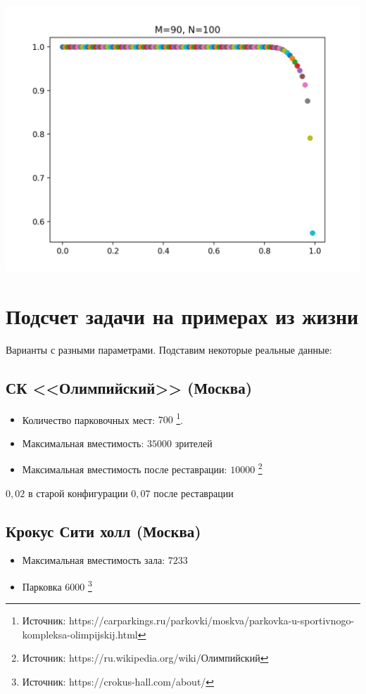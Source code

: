 \includegraphics[scale=0.5]{img/100_90}

\section{Подсчет задачи на примерах из жизни}

Варианты с разными параметрами. Подставим некоторые реальные данные:

\subsection{СК <<Олимпийский>> (Москва)}

\begin{itemize}
	\item Количество парковочных мест: $700$ \footnote{Источник: https://carparkings.ru/parkovki/moskva/parkovka-u-sportivnogo-kompleksa-olimpijskij.html}.
	\item Максимальная вместимость: $35 000$ зрителей
	\item Максимальная вместимость после реставрации: $10 000$ \footnote{Источник: https://ru.wikipedia.org/wiki/Олимпийский}
\end{itemize}
$0,02$ в старой конфигурации
$0,07$ после реставрации

\subsection{Крокус Сити холл (Москва)}
\begin{itemize}
	\item Максимальная вместимость зала: $7233$
	\item Парковка $6000$ \footnote{Источник: https://crokus-hall.com/about/}
\end{itemize}

